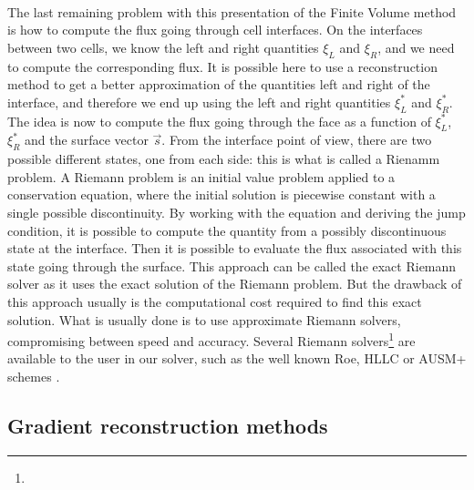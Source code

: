       \paragraph{}
      The last remaining problem with this presentation of the Finite Volume method is how to compute the flux going through cell interfaces.
      On the interfaces between two cells, we know the left and right quantities $\xi_L$ and $\xi_R$, and we need to compute the corresponding flux.
      It is possible here to use a reconstruction method to get a better approximation of the quantities left and right of the interface, and therefore we end up using the left and right quantities $\xi_L^*$ and $\xi_R^*$.
      The idea is now to compute the flux going through the face as a function of $\xi_L^*$, $\xi_R^*$ and the surface vector $\vec{s}$.
      From the interface point of view, there are two possible different states, one from each side: this is what is called a Rienamm problem.
      A Riemann problem is an initial value problem applied to a conservation equation, where the initial solution is piecewise constant with a single possible discontinuity.
      By working with the equation and deriving the jump condition, it is possible to compute the quantity from a possibly discontinuous state at the interface.
      Then it is possible to evaluate the flux associated with this state going through the surface.
      This approach can be called the exact Riemann solver as it uses the exact solution of the Riemann problem.
      But the drawback of this approach usually is the computational cost required to find this exact solution.
      What is usually done is to use approximate Riemann solvers, compromising between speed and accuracy.
      Several Riemann solvers\footnote{} are available to the user in our solver, such as the well known Roe, HLLC or AUSM+ schemes \cite{Roe1981, Toro2009}.


    \subsection{Gradient reconstruction methods}

